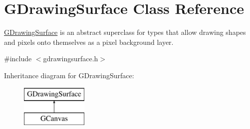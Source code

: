 \hypertarget{classsgl_1_1GDrawingSurface}{}\section{G\+Drawing\+Surface Class Reference}
\label{classsgl_1_1GDrawingSurface}


\mbox{\hyperlink{classsgl_1_1GDrawingSurface}{G\+Drawing\+Surface}} is an abstract superclass for types that allow drawing shapes and pixels onto themselves as a pixel background layer.  




{\ttfamily \#include $<$gdrawingsurface.\+h$>$}

Inheritance diagram for G\+Drawing\+Surface\+:\begin{figure}[H]
\begin{center}
\leavevmode
\includegraphics[height=2.000000cm]{classsgl_1_1GDrawingSurface}
\end{center}
\end{figure}
